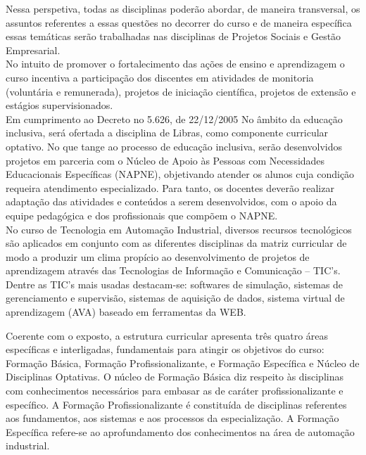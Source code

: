Nessa perspetiva, todas as disciplinas poderão abordar, de maneira transversal, os assuntos referentes a essas questões no decorrer do curso e de maneira específica essas temáticas serão trabalhadas nas disciplinas de  Projetos Sociais e Gestão Empresarial.\\

No intuito de promover o fortalecimento das ações de ensino e aprendizagem o curso incentiva a participação dos discentes em atividades de monitoria (voluntária e remunerada), projetos de iniciação científica, projetos de extensão e estágios supervisionados.\\

Em cumprimento ao Decreto no 5.626, de 22/12/2005 No âmbito da educação inclusiva, será ofertada a disciplina de Libras, como componente curricular optativo. No que tange ao processo de educação inclusiva, serão desenvolvidos projetos em parceria com o Núcleo de Apoio às Pessoas com Necessidades Educacionais Específicas (NAPNE), objetivando atender os alunos cuja condição requeira atendimento especializado. Para tanto, os docentes deverão realizar adaptação das atividades e conteúdos a serem desenvolvidos, com o apoio da equipe pedagógica e dos profissionais que compõem o NAPNE.\\

No curso de Tecnologia em Automação Industrial, diversos recursos tecnológicos são aplicados em conjunto com as diferentes disciplinas da matriz curricular de modo a produzir um clima propício ao desenvolvimento de projetos de aprendizagem através das Tecnologias de Informação e Comunicação – TIC’s. Dentre as TIC’s mais usadas destacam-se: softwares de simulação, sistemas de gerenciamento e supervisão, sistemas de aquisição de dados, sistema virtual de aprendizagem (AVA) baseado em ferramentas da WEB.

Coerente com o exposto, a estrutura curricular apresenta três quatro áreas específicas e interligadas, fundamentais para atingir os objetivos do curso: Formação Básica, Formação Profissionalizante, e Formação Específica e Núcleo de Disciplinas Optativas. O núcleo de Formação Básica diz respeito às disciplinas com conhecimentos necessários para embasar as de caráter profissionalizante e específico. A Formação Profissionalizante é constituída de disciplinas referentes aos fundamentos, aos sistemas e aos processos da especialização. A Formação Específica refere-se ao aprofundamento dos conhecimentos na área de automação industrial.\\


